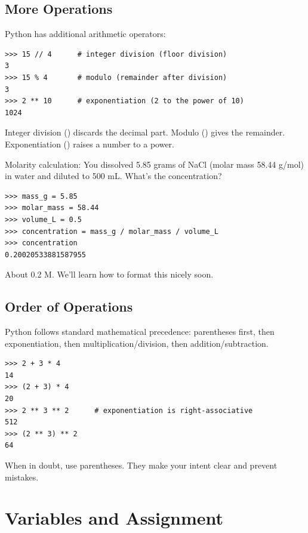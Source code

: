 \subsection{More Operations}

Python has additional arithmetic operators:

\begin{lstlisting}
>>> 15 // 4      # integer division (floor division)
3
>>> 15 % 4       # modulo (remainder after division)
3
>>> 2 ** 10      # exponentiation (2 to the power of 10)
1024
\end{lstlisting}

Integer division (\py{//}) discards the decimal part. Modulo (\py{\%}) gives the remainder. Exponentiation (\py{**}) raises a number to a power.

\begin{labexample}
Molarity calculation: You dissolved 5.85 grams of NaCl (molar mass 58.44 g/mol) in water and diluted to 500 mL. What's the concentration?

\begin{lstlisting}
>>> mass_g = 5.85
>>> molar_mass = 58.44
>>> volume_L = 0.5
>>> concentration = mass_g / molar_mass / volume_L
>>> concentration
0.20020533881587955
\end{lstlisting}

About 0.2 M. We'll learn how to format this nicely soon.
\end{labexample}

\subsection{Order of Operations}

Python follows standard mathematical precedence: parentheses first, then exponentiation, then multiplication/division, then addition/subtraction.

\begin{lstlisting}
>>> 2 + 3 * 4
14
>>> (2 + 3) * 4
20
>>> 2 ** 3 ** 2      # exponentiation is right-associative
512
>>> (2 ** 3) ** 2
64
\end{lstlisting}

When in doubt, use parentheses. They make your intent clear and prevent mistakes.

\section{Variables and Assignment}
\label{sec:variables}

